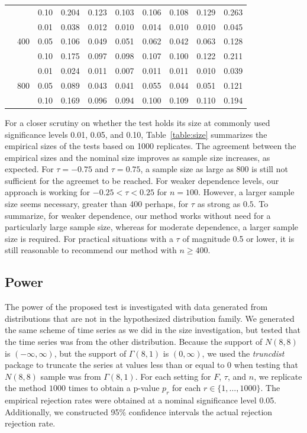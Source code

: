 \documentclass[12pt, titlepage, letterpaper]{article}
\begin{document}
\begin{table}[ht]
\begin{tabular}{lllrrrrrrr}
  & & 0.10 & 0.204 & 0.123 & 0.103 & 0.106 & 0.108 & 0.129 & 0.263 \\ 
  & \multirow{3}{2em}{400} & 0.01 & 0.038 & 0.012 & 0.010 & 0.014 & 0.010 & 0.010 & 0.045 \\ 
  & & 0.05 & 0.106 & 0.049 & 0.051 & 0.062 & 0.042 & 0.063 & 0.128 \\ 
  & & 0.10 & 0.175 & 0.097 & 0.098 & 0.107 & 0.100 & 0.122 & 0.211 \\ 
  & \multirow{3}{2em}{800} & 0.01 & 0.024 & 0.011 & 0.007 & 0.011 & 0.011 & 0.010 & 0.039 \\ 
  & & 0.05 & 0.089 & 0.043 & 0.041 & 0.055 & 0.044 & 0.051 & 0.121 \\ 
  & & 0.10 & 0.169 & 0.096 & 0.094 & 0.100 & 0.109 & 0.110 & 0.194 \\ 
   \bottomrule
   
\end{tabular}
\end{table}


For a closer scrutiny on whether the test holds its size at commonly used
significance levels 0.01, 0.05, and 0.10, Table~\ref{table:size}
summarizes the empirical sizes of the tests based on 1000 replicates.
The agreement between the empirical sizes and the nominal size
improves as sample size increases, as expected. For $\tau = -0.75$
and $\tau = 0.75$, a sample size as large as 800 is still not sufficient for the
agreemet to be reached. For weaker dependence levels, our approach is working
for $-0.25 < \tau < 0.25$ for $n = 100$. However, a larger sample size seems 
necessary, greater than 400 perhaps, for $\tau$ as strong as $0.5$. To 
summarize, for weaker dependence, our method works without need for a 
particularly large sample size, whereas for moderate dependence, a larger sample
size is required. For practical situations with a $\tau$ of magnitude 0.5 or
lower, it is still reasonable to recommend our method with $n \ge 400$.



\subsection{Power}
The power of the proposed test is investigated with data generated from
distributions that are not in the hypothesized distribution family. 
We generated the same scheme of time series as we did in the size investigation,
but tested that the time series was from the other distribution.
Because the support of $N(8, 8)$ is
$(-\infty, \infty)$, but the support of $\Gamma(8, 1)$ is $(0, \infty)$, we used
the \textsl{truncdist} package \citep{truncdist} to truncate the series at 
values less than or equal to 0 when testing that $N(8, 8)$ sample was
from $\Gamma(8, 1)$. For each setting for $F$, $\tau$, and $n$, we replicate the 
method $1000$ times 
to obtain a p-value $p_r$ for each $r \in \{1, \ldots, 1000\}$.
The empirical rejection rates were obtained at a nominal significance level 0.05.
Additionally, we constructed 95\% confidence intervals the actual rejection
rejection rate.
\end{document}
